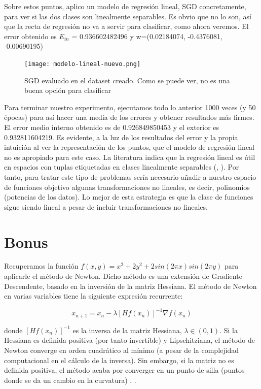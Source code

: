 Sobre estos puntos, aplico un modelo de regresión lineal, SGD concretamente, para ver si las dos clases son linealmente separables. Es obvio que no lo son, así que la recta de regresión no va a servir para clasificar, como ahora veremos. El error obtenido es $E_{in}$ = 0.936602482496 y w=(0.02184074, -0.4376081, -0.00690195)

\begin{figure}[H] %
	\centering
	\texttt{[image: modelo-lineal-nuevo.png]}  %
	\caption{SGD evaluado en el dataset creado. Como se puede ver, no es una buena opción para clasificar} 
	\label{fig:sgd-p}
\end{figure}

Para terminar nuestro experimento, ejecutamos todo lo anterior 1000 veces (y 50 épocas) para así hacer una media de los errores y obtener resultados más firmes. El error medio interno obtenido es de 0.926849850453 y el exterior es  0.932811604219. Es evidente, a la luz de los resultados del error y la propia intuición al ver la representación de los puntos, que el modelo de regresión lineal no es apropiado para este caso. La literatura indica que la regresión lineal es útil en espacios con tuplas etiquetadas en clases linealmente separables (\cite{lfd}, \cite{ctm}). Por tanto, para tratar este tipo de problemas sería necesario añadir a nuestro espacio de funciones objetivo algunas transformaciones no lineales, es decir, polinomios (potencias de los datos). Lo mejor de esta estrategia es que la clase de funciones sigue siendo lineal a pesar de incluir transformaciones no lineales.

\section{Bonus}

Recuperamos la función $f(x,y)=x^2+2y^2+2sin(2\pi x) sin(2\pi y)$ para aplicarle el método de Newton. Dicho método es una extensión de Gradiente Descendente, basado en la inversión de la matriz Hessiana. El método de Newton en varias variables tiene la siguiente expresión recurrente:

$$ x_{n+1} = x_{n} - \lambda [Hf(x_n)]^{-1} \nabla f(x_n)$$

donde $[Hf(x_n)]^{-1}$ es la inversa de la matriz Hessiana, $\lambda \in (0,1)$. Si la Hessiana es definida positiva (por tanto invertible) y Lipschitziana, el método de Newton converge en orden cuadrático al mínimo (a pesar de la complejidad computacional en el cálculo de la inversa). Sin embargo, si la matriz no es definida positiva, el método acaba por converger en un punto de silla (puntos donde se da un cambio en la curvatura) \cite{pam}, \cite{np}.


